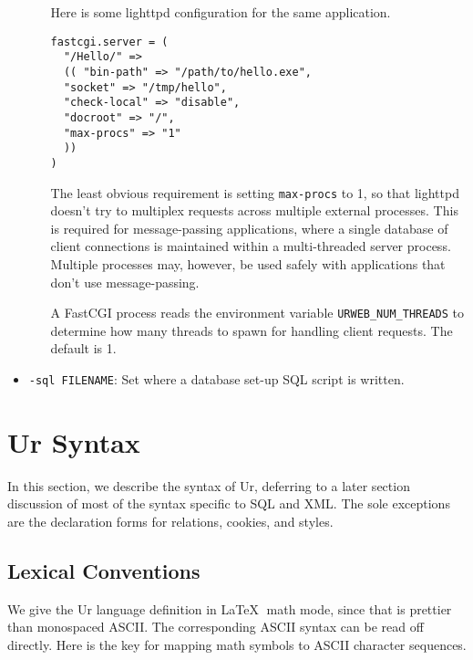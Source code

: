 \documentclass{article}
\begin{document}
\begin{itemize}
\begin{itemize}
    Here is some lighttpd configuration for the same application.
    \begin{verbatim}
fastcgi.server = (
  "/Hello/" =>
  (( "bin-path" => "/path/to/hello.exe",
  "socket" => "/tmp/hello",
  "check-local" => "disable",
  "docroot" => "/",
  "max-procs" => "1"
  ))
)
    \end{verbatim}
    The least obvious requirement is setting \texttt{max-procs} to 1, so that lighttpd doesn't try to multiplex requests across multiple external processes.  This is required for message-passing applications, where a single database of client connections is maintained within a multi-threaded server process.  Multiple processes may, however, be used safely with applications that don't use message-passing.

    A FastCGI process reads the environment variable \texttt{URWEB\_NUM\_THREADS} to determine how many threads to spawn for handling client requests.  The default is 1.
  \end{itemize}

\item \texttt{-sql FILENAME}: Set where a database set-up SQL script is written.
\end{itemize}


\section{Ur Syntax}

In this section, we describe the syntax of Ur, deferring to a later section discussion of most of the syntax specific to SQL and XML.  The sole exceptions are the declaration forms for relations, cookies, and styles.

\subsection{Lexical Conventions}

We give the Ur language definition in \LaTeX $\;$ math mode, since that is prettier than monospaced ASCII.  The corresponding ASCII syntax can be read off directly.  Here is the key for mapping math symbols to ASCII character sequences.
\end{document}
